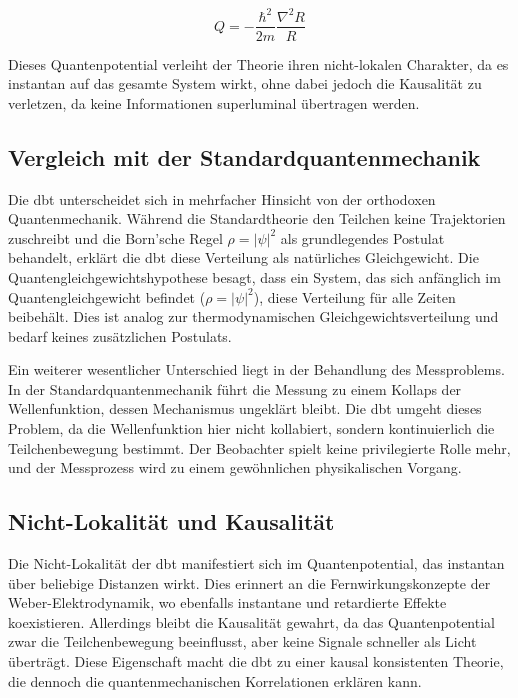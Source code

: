 \begin{equation}
    Q = -\frac{\hbar^2}{2m} \frac{\nabla^2 R}{R}
\end{equation}

Dieses Quantenpotential verleiht der Theorie ihren nicht-lokalen Charakter, da es instantan auf das gesamte System wirkt, ohne dabei jedoch die Kausalität zu verletzen, da keine
Informationen superluminal übertragen werden.

\subsection{Vergleich mit der Standardquantenmechanik}
Die \gls{dbt} unterscheidet sich in mehrfacher Hinsicht von der orthodoxen Quantenmechanik. Während die Standardtheorie den Teilchen keine Trajektorien zuschreibt und die
Born'sche Regel $\rho = \lvert \psi \rvert^{2}$ als grundlegendes Postulat behandelt, erklärt die \gls{dbt} diese Verteilung als natürliches Gleichgewicht. Die
Quantengleichgewichtshypothese besagt, dass ein System, das sich anfänglich im Quantengleichgewicht befindet ($\rho = \lvert \psi \rvert^{2}$), diese Verteilung für alle
Zeiten beibehält. Dies ist analog zur thermodynamischen Gleichgewichtsverteilung und bedarf keines zusätzlichen Postulats.

Ein weiterer wesentlicher Unterschied liegt in der Behandlung des Messproblems. In der Standardquantenmechanik führt die Messung zu einem Kollaps der Wellenfunktion, dessen
Mechanismus ungeklärt bleibt. Die \gls{dbt} umgeht dieses Problem, da die Wellenfunktion hier nicht kollabiert, sondern kontinuierlich die Teilchenbewegung bestimmt. Der Beobachter
spielt keine privilegierte Rolle mehr, und der Messprozess wird zu einem gewöhnlichen physikalischen Vorgang.

\subsection{Nicht-Lokalität und Kausalität}
Die Nicht-Lokalität der \gls{dbt} manifestiert sich im Quantenpotential, das instantan über beliebige Distanzen wirkt. Dies erinnert an die Fernwirkungskonzepte der Weber-Elektrodynamik,
wo ebenfalls instantane und retardierte Effekte koexistieren. Allerdings bleibt die Kausalität gewahrt, da das Quantenpotential zwar die Teilchenbewegung beeinflusst, aber keine Signale
schneller als Licht überträgt. Diese Eigenschaft macht die \gls{dbt} zu einer kausal konsistenten Theorie, die dennoch die quantenmechanischen Korrelationen erklären kann.

